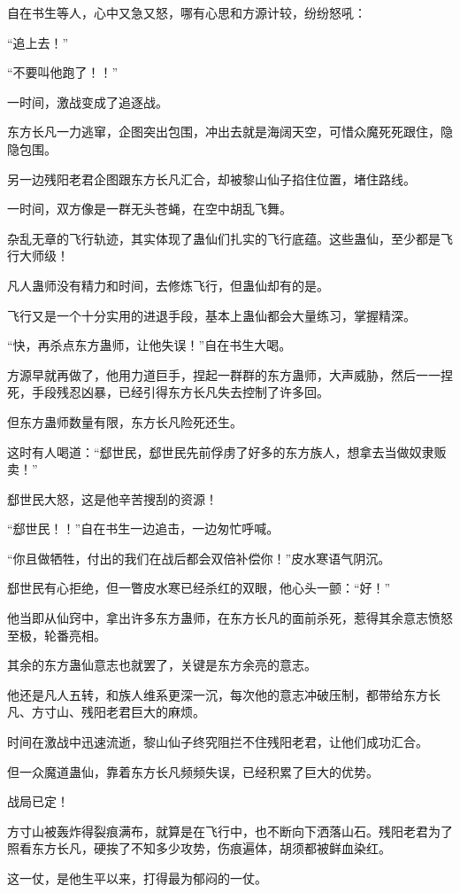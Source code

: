 \begin{this_body}
自在书生等人，心中又急又怒，哪有心思和方源计较，纷纷怒吼：

“追上去！”

“不要叫他跑了！！”

一时间，激战变成了追逐战。

东方长凡一力逃窜，企图突出包围，冲出去就是海阔天空，可惜众魔死死跟住，隐隐包围。

另一边残阳老君企图跟东方长凡汇合，却被黎山仙子掐住位置，堵住路线。

一时间，双方像是一群无头苍蝇，在空中胡乱飞舞。

杂乱无章的飞行轨迹，其实体现了蛊仙们扎实的飞行底蕴。这些蛊仙，至少都是飞行大师级！

凡人蛊师没有精力和时间，去修炼飞行，但蛊仙却有的是。

飞行又是一个十分实用的进退手段，基本上蛊仙都会大量练习，掌握精深。

“快，再杀点东方蛊师，让他失误！”自在书生大喝。

方源早就再做了，他用力道巨手，捏起一群群的东方蛊师，大声威胁，然后一一捏死，手段残忍凶暴，已经引得东方长凡失去控制了许多回。

但东方蛊师数量有限，东方长凡险死还生。

这时有人喝道：“郄世民，郄世民先前俘虏了好多的东方族人，想拿去当做奴隶贩卖！”

郄世民大怒，这是他辛苦搜刮的资源！

“郄世民！！”自在书生一边追击，一边匆忙呼喊。

“你且做牺牲，付出的我们在战后都会双倍补偿你！”皮水寒语气阴沉。

郄世民有心拒绝，但一瞥皮水寒已经杀红的双眼，他心头一颤：“好！”

他当即从仙窍中，拿出许多东方蛊师，在东方长凡的面前杀死，惹得其余意志愤怒至极，轮番亮相。

其余的东方蛊仙意志也就罢了，关键是东方余亮的意志。

他还是凡人五转，和族人维系更深一沉，每次他的意志冲破压制，都带给东方长凡、方寸山、残阳老君巨大的麻烦。

时间在激战中迅速流逝，黎山仙子终究阻拦不住残阳老君，让他们成功汇合。

但一众魔道蛊仙，靠着东方长凡频频失误，已经积累了巨大的优势。

战局已定！

方寸山被轰炸得裂痕满布，就算是在飞行中，也不断向下洒落山石。残阳老君为了照看东方长凡，硬挨了不知多少攻势，伤痕遍体，胡须都被鲜血染红。

这一仗，是他生平以来，打得最为郁闷的一仗。


\end{this_body}

